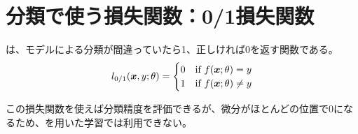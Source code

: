 \documentclass[../../../topic_machine-learning]{subfiles}
\begin{document}
\sectionline
\section{分類で使う損失関数：0/1損失関数}

は、モデルによる分類が間違っていたら1、正しければ0を返す関数である。
\begin{equation*}
  l_{0/1}(\vb*{x}, y; \theta) = \begin{cases}
    0 & \text{if } f(\vb*{x}; \theta) = y \\
    1 & \text{if } f(\vb*{x}; \theta) \neq y
  \end{cases}
\end{equation*}

この損失関数を使えば分類精度を評価できるが、微分がほとんどの位置で0になるため、を用いた学習では利用できない。
\end{document}
